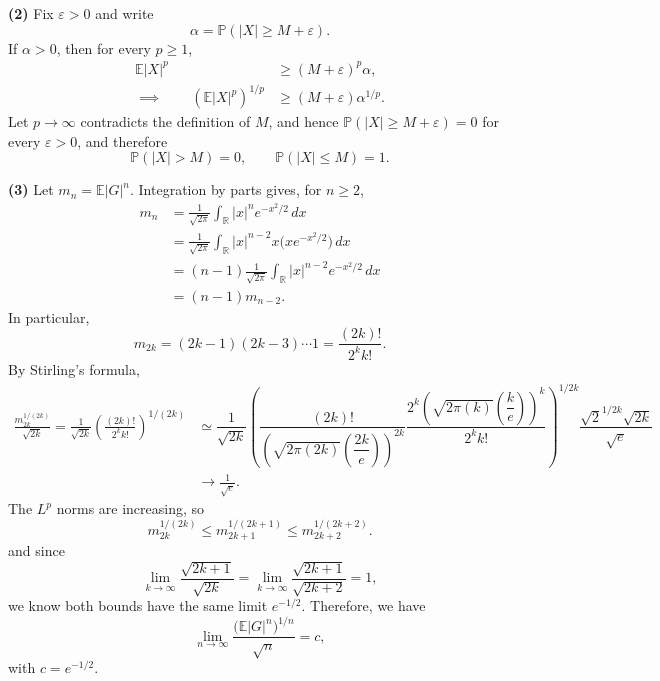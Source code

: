 \documentclass[lang=en,11pt,a4paper,citestyle=authoryear]{elegantpaper}
\newcommand{\R}{\mathbb{R}}
\begin{document}
\textbf{(2)} Fix $\varepsilon>0$ and write
\[
\alpha=\mathbb P(|X|\geq M+\varepsilon).
\]
If $\alpha>0$, then for every $p\geq1$,
\[
\begin{aligned}
\mathbb E|X|^p&\geq(M+\varepsilon)^p\alpha,\\
\implies \qquad
\left(\mathbb E|X|^p\right)^{1/p}
&\geq(M+\varepsilon)\alpha^{1/p}.
\end{aligned}
\]
Let $p\to\infty$ contradicts the definition of $M$, and hence
$\mathbb P(|X|\geq M+\varepsilon)=0$ for every $\varepsilon>0$, and therefore
\[
\mathbb P(|X|>M)=0,
\qquad
\mathbb P(|X|\leq M)=1.
\]

\textbf{(3)} Let $m_n=\mathbb E|G|^n$. Integration by parts gives, for
$n\geq2$,
\[
\begin{aligned}
m_n
&=\frac1{\sqrt{2\pi}}
  \int_{\R}|x|^n e^{-x^2/2}\,dx\\
&=\frac1{\sqrt{2\pi}}
  \int_{\R}|x|^{n-2}x\bigl(xe^{-x^2/2}\bigr)\,dx\\
&=(n-1)\frac1{\sqrt{2\pi}}
  \int_{\R}|x|^{n-2}e^{-x^2/2}\,dx\\
&=(n-1)m_{n-2}.
\end{aligned}
\]
In particular,
\[
m_{2k}=(2k-1)(2k-3)\cdots1
=\frac{(2k)!}{2^k k!}.
\]
By Stirling's formula,
\[
\begin{aligned}
\frac{m_{2k}^{1/(2k)}}{\sqrt{2k}}
=\frac1{\sqrt{2k}}
 \left(\frac{(2k)!}{2^k k!}\right)^{1/(2k)} &\simeq  \dfrac{1}{\sqrt{2k}}\left(\dfrac{(2k)!}{\left(\sqrt{2\pi(2k)}\left(\dfrac{2k}{e}\right)\right)^{2k}}\dfrac{2^k\left(\sqrt{2\pi(k)}\left(\dfrac{k}{e}\right)\right)^{k}}{2^kk!}\right)^{1/2k}\dfrac{\sqrt{2}^{1/2k}\sqrt{2k}}{\sqrt{e}}\\
& \longrightarrow \frac1{\sqrt e}.
\end{aligned}
\]
The $L^p$ norms are increasing, so
\[
m_{2k}^{1/(2k)}
\leq m_{2k+1}^{1/(2k+1)}
\leq m_{2k+2}^{1/(2k+2)}.
\]
and since \[\lim\limits_{k\to\infty} \dfrac{\sqrt{2k+1}}{\sqrt{2k}} = \lim\limits_{k\to\infty} \dfrac{\sqrt{2k+1}}{\sqrt{2k+2}} =1,\] we know both bounds have the same limit
$e^{-1/2}$. Therefore, we have
\[
\lim_{n\to\infty}
\frac{\bigl(\mathbb E|G|^n\bigr)^{1/n}}{\sqrt n}
= c,
\]
with $c=e^{-1/2}$.
\end{document}
